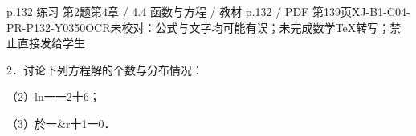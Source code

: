 \begin{bankitem}{p.132 练习 第2题}{第4章 / 4.4 函数与方程 / 教材 p.132 / PDF 第139页}{XJ-B1-C04-PR-P132-Y0350}{OCR未校对：公式与文字均可能有误；未完成数学TeX转写；禁止直接发给学生}
\begin{ocrdraft}
\par
2．讨论下列方程解的个数与分布情况：
\par
（2）ln一一2十6；
\par
（3）於一\&r十1一0．
\end{ocrdraft}
\end{bankitem}
